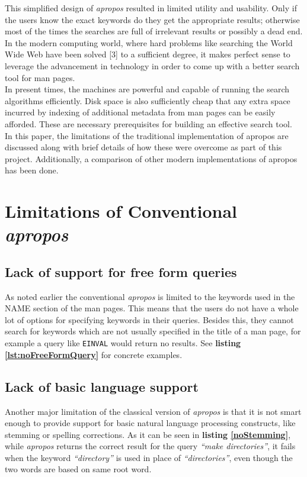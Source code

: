 \documentclass[letterpaper,twocolumn,10pt]{article}
\begin{document}
This simplified design of \textit{apropos} resulted in limited utility and
usability. Only if the users know the exact keywords do they get
the appropriate results; otherwise most of
the times the searches are full of irrelevant results or possibly a dead end. 
In the modern
computing world, where hard problems like searching the World Wide Web have been
solved [3] to a sufficient degree, it makes perfect sense to leverage the
advancement in technology in order to come up with a better search tool for
man pages. \\

In present times, the machines are powerful and  capable of running the search
algorithms efficiently. Disk
space is also sufficiently cheap that any extra space incurred by indexing of
additional metadata from man pages
can be easily afforded. These are necessary prerequisites for building an
effective search tool. \\

In this paper, the limitations of the traditional implementation of apropos
are discussed along with brief details of how these were overcome as part of
this project. Additionally, a comparison of other modern implementations of apropos has been done. \\

\section{Limitations of Conventional \textit{apropos}}

\subsection{Lack of support for free form queries}
As noted earlier the conventional \textit{apropos} is limited to the keywords
used in the NAME section of the man pages. This means that the users do not have
a whole lot of options for specifying keywords in their queries. Besides this,
they cannot search for keywords which are not usually specified in the title of
a man page, for example a query like {\tt EINVAL} would return no results.
See {\bf listing \ref{lst:noFreeFormQuery}} for concrete examples.  \\

\subsection{Lack of basic language support}
Another major limitation of the classical version of \textit{apropos} is that
it is not smart enough to provide support for basic natural language processing
constructs,
like stemming or spelling corrections.
As it can be seen in {\bf listing \ref{noStemming}},
while \textit{apropos} returns the correct result for the query
\textit{``make directories''}, it fails when the keyword \textit{``directory''}
is used in place of \textit{``directories''}, even though the two words are based
on same root word. \\
\end{document}
